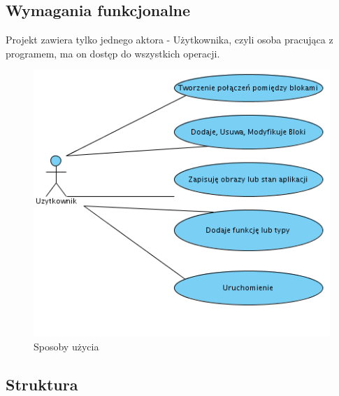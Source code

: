 \documentclass[a4paper,10pt]{article}
\begin{document}
\subsection{Wymagania funkcjonalne}
Projekt zawiera tylko jednego aktora - Użytkownika, czyli osoba pracująca z programem, ma on dostęp do wszystkich operacji.
\begin{figure}[h]
\begin{center}
\includegraphics[scale=0.7]{UseCase}
\end{center}
\caption{Sposoby użycia}
\label{fig:usecase}
\end{figure}
\newpage 
\subsection{Struktura}
\end{document}
